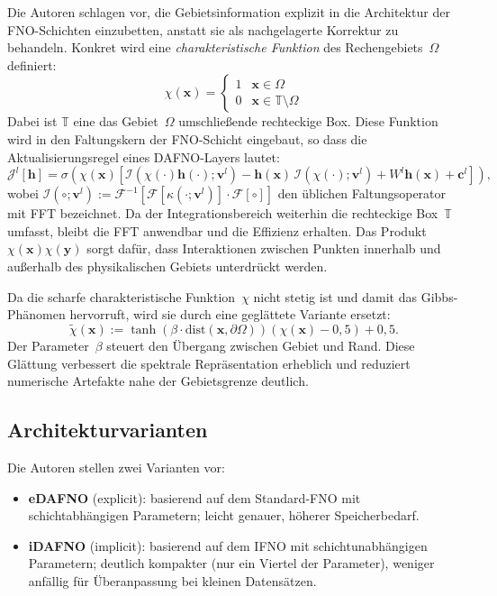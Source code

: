 \documentclass[a4paper,12pt]{article}
\begin{document}
Die Autoren schlagen vor, die Gebietsinformation explizit in die Architektur der
FNO-Schichten einzubetten, anstatt sie als nachgelagerte Korrektur zu behandeln.
Konkret wird eine \emph{charakteristische Funktion} des Rechengebiets~$\Omega$
definiert:
\[
    \chi(\mathbf{x}) =
    \begin{cases}
        1 & \mathbf{x} \in \Omega \\
        0 & \mathbf{x} \in \mathbb{T} \setminus \Omega
    \end{cases}
\]
Dabei ist $\mathbb{T}$ eine das Gebiet~$\Omega$ umschlie\ss{}ende rechteckige
Box. Diese Funktion wird in den Faltungskern der FNO-Schicht eingebaut, so dass
die Aktualisierungsregel eines DAFNO-Layers lautet:
\[
    \mathcal{J}^l[\mathbf{h}]
    = \sigma\!\left(
        \chi(\mathbf{x})\!\left[
            \mathcal{I}\!\left(\chi(\cdot)\mathbf{h}(\cdot);\mathbf{v}^l\right)
            - \mathbf{h}(\mathbf{x})\,\mathcal{I}\!\left(\chi(\cdot);\mathbf{v}^l\right)
            + W^l \mathbf{h}(\mathbf{x}) + \mathbf{c}^l
        \right]
    \right),
\]
wobei $\mathcal{I}(\circ;\mathbf{v}^l) := \mathcal{F}^{-1}[\mathcal{F}[\kappa(\cdot;\mathbf{v}^l)]
\cdot \mathcal{F}[\circ]]$ den \"ublichen Faltungsoperator mit FFT bezeichnet.
Da der Integrationsbereich weiterhin die rechteckige Box~$\mathbb{T}$ umfasst,
bleibt die FFT anwendbar und die Effizienz erhalten. Das Produkt
$\chi(\mathbf{x})\chi(\mathbf{y})$ sorgt daf\"ur, dass Interaktionen zwischen
Punkten innerhalb und au\ss{}erhalb des physikalischen Gebiets unterdr\"uckt werden.

Da die scharfe charakteristische Funktion~$\chi$ nicht stetig ist und damit das
Gibbs-Ph\"anomen hervorruft, wird sie durch eine gegl\"attete Variante ersetzt:
\[
    \tilde{\chi}(\mathbf{x})
    := \tanh\!\left(\beta \cdot \mathrm{dist}(\mathbf{x}, \partial\Omega)\right)
       \left(\chi(\mathbf{x}) - 0{,}5\right) + 0{,}5.
\]
Der Parameter~$\beta$ steuert den \"Ubergang zwischen Gebiet und Rand. Diese
Gl\"attung verbessert die spektrale Repr\"asentation erheblich und reduziert
numerische Artefakte nahe der Gebietsgrenze deutlich.

\subsection*{Architekturvarianten}

Die Autoren stellen zwei Varianten vor:
\begin{itemize}
    \item \textbf{eDAFNO} (explicit): basierend auf dem Standard-FNO mit
          schichtabh\"angigen Parametern; leicht genauer, h\"oherer
          Speicherbedarf.
    \item \textbf{iDAFNO} (implicit): basierend auf dem IFNO mit
          schichtunabh\"angigen Parametern; deutlich kompakter (nur ein Viertel
          der Parameter), weniger anf\"allig f\"ur \"Uberanpassung bei kleinen
          Datens\"atzen.
\end{itemize}
\end{document}
